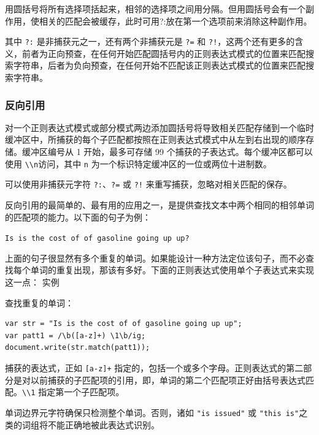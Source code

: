 \documentclass[doctor,openright,twoside]{sjtuthesis}
\newcommand{\passthrough}[1]{#1}
\theoremstyle{plain}
\theoremstyle{definition}
\theoremstyle{remark}
\theoremstyle{ocrenumbox}
\theoremstyle{plain}
\begin{document}
用圆括号将所有选择项括起来，相邻的选择项之间用\textbar{}分隔。但用圆括号会有一个副作用，使相关的匹配会被缓存，此时可用?:放在第一个选项前来消除这种副作用。

其中 \passthrough{\lstinline!?:!} 是非捕获元之一，还有两个非捕获元是
\passthrough{\lstinline!?=!} 和
\passthrough{\lstinline"?!"}，这两个还有更多的含义，前者为正向预查，在任何开始匹配圆括号内的正则表达式模式的位置来匹配搜索字符串，后者为负向预查，在任何开始不匹配该正则表达式模式的位置来匹配搜索字符串。

\subsubsection{反向引用}

对一个正则表达式模式或部分模式两边添加圆括号将导致相关匹配存储到一个临时缓冲区中，所捕获的每个子匹配都按照在正则表达式模式中从左到右出现的顺序存储。缓冲区编号从
1 开始，最多可存储 99 个捕获的子表达式。每个缓冲区都可以使用
\passthrough{\lstinline!\\n!}访问，其中 \passthrough{\lstinline!n!}
为一个标识特定缓冲区的一位或两位十进制数。

可以使用非捕获元字符
\passthrough{\lstinline!?:!}、\passthrough{\lstinline!?=!} 或
\passthrough{\lstinline"?!"} 来重写捕获，忽略对相关匹配的保存。

反向引用的最简单的、最有用的应用之一，是提供查找文本中两个相同的相邻单词的匹配项的能力。以下面的句子为例：

\passthrough{\lstinline!Is is the cost of of gasoline going up up?!}

上面的句子很显然有多个重复的单词。如果能设计一种方法定位该句子，而不必查找每个单词的重复出现，那该有多好。下面的正则表达式使用单个子表达式来实现这一点：
实例

查找重复的单词：

\begin{lstlisting}
var str = "Is is the cost of of gasoline going up up";
var patt1 = /\b([a-z]+) \1\b/ig;
document.write(str.match(patt1));
\end{lstlisting}

捕获的表达式，正如 \passthrough{\lstinline![a-z]+!}
指定的，包括一个或多个字母。正则表达式的第二部分是对以前捕获的子匹配项的引用，即，单词的第二个匹配项正好由括号表达式匹配。\passthrough{\lstinline!\\1!}
指定第一个子匹配项。

单词边界元字符确保只检测整个单词。否则，诸如
\passthrough{\lstinline!"is issued"!} 或
\passthrough{\lstinline!"this is"!}之类的词组将不能正确地被此表达式识别。
\end{document}

